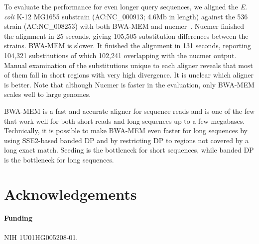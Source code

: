 \documentclass{bioinfo}
\begin{document}
To evaluate the performance for even longer query sequences, we aligned the
{\it E. coli} K-12 MG1655 substrain (AC:NC\_000913; 4.6Mb in length) against
the 536 strain (AC:NC\_008253) with both BWA-MEM and
nucmer~\citep{Kurtz:2004zr}. Nucmer finished the alignment in 25 seconds,
giving 105,505 substitution differences between the strains. BWA-MEM is slower.
It finished the alignment in 131 seconds, reporting 104,321 substitutions of
which 102,241 overlapping with the nucmer output. Manual examination of the
substitutions unique to each aligner reveals that most of them fall in short
regions with very high divergence. It is unclear which aligner is better. Note
that although Nucmer is faster in the evaluation, only BWA-MEM scales well to
large genomes.

BWA-MEM is a fast and accurate aligner for sequence reads and is one of the few
that work well for both short reads and long sequences up to a few megabases.
Technically, it is possible to make BWA-MEM even faster for long sequences by
using SSE2-based banded DP and by restricting DP to regions not covered by a
long exact match. Seeding is the bottleneck for short sequences, while banded
DP is the bottleneck for long sequences.

\section{Acknowledgements}
\paragraph{Funding\textcolon} NIH 1U01HG005208-01.

\end{document}
